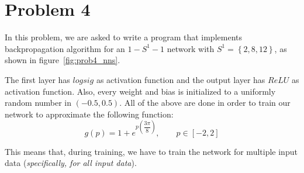 \section{Problem 4}

In this problem, we are asked to write a program that implements backpropagation algorithm for an $1 - S^1 - 1$ network with $S^1=\left\{2,8,12\right\}$, as shown in figure~\ref{fig:prob4_nns}.

The first layer has $logsig$ as activation function and the output layer has $ReLU$ as activation function. Also, every weight and bias is initialized to a uniformly random number in $\left(-0.5, 0.5\right)$.
All of the above are done in order to train our network to approximate the following function:
\[
g(p) = 1 + e^{p\left(\dfrac{3\pi}{8}\right)}, \qquad p \in \left[-2,2\right]
\]

This means that, during training, we have to train the network for multiple input data (\textit{specifically, for all input data}).

